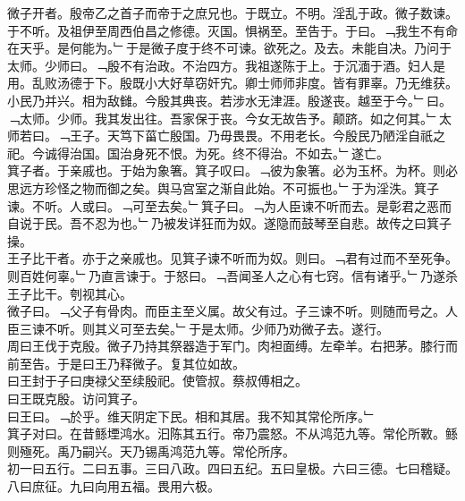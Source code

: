 \documentclass{zhvt-classic}
\begin{document}

\hspace*{2em}微子开者。殷帝乙之首子而帝于之庶兄也。于既立。不明。淫乱于政。微子数谏。于不听。及祖伊至周西伯昌之修德。灭国。惧祸至。至告于。于曰。﹁我生不有命在天乎。是何能为。﹂于是微子度于终不可谏。欲死之。及去。未能自决。乃问于太师。少师曰。﹁殷不有治政。不治四方。我祖遂陈于上。于沉湎于酒。妇人是用。乱败汤德于下。殷既小大好草窃奸宄。卿士师师非度。皆有罪辜。乃无维获。小民乃并兴。相为敌雠。今殷其典丧。若涉水无津涯。殷遂丧。越至于今。﹂曰。﹁太师。少师。我其发出往。吾家保于丧。今女无故告予。颠跻。如之何其。﹂太师若曰。﹁王子。天笃下菑亡殷国。乃毋畏畏。不用老长。今殷民乃陋淫自祇之祀。今诚得治国。国治身死不恨。为死。终不得治。不如去。﹂遂亡。\\
\hspace*{2em}箕子者。于亲戚也。于始为象箸。箕子叹曰。﹁彼为象箸。必为玉杯。为杯。则必思远方珍怪之物而御之矣。舆马宫室之渐自此始。不可振也。﹂于为淫泆。箕子谏。不听。人或曰。﹁可至去矣。﹂箕子曰。﹁为人臣谏不听而去。是彰君之恶而自说于民。吾不忍为也。﹂乃被发详狂而为奴。遂隐而鼓琴至自悲。故传之曰箕子操。\\
\hspace*{2em}王子比干者。亦于之亲戚也。见箕子谏不听而为奴。则曰。﹁君有过而不至死争。则百姓何辜。﹂乃直言谏于。于怒曰。﹁吾闻圣人之心有七窍。信有诸乎。﹂乃遂杀王子比干。刳视其心。\\
\hspace*{2em}微子曰。﹁父子有骨肉。而臣主至义属。故父有过。子三谏不听。则随而号之。人臣三谏不听。则其义可至去矣。﹂于是太师。少师乃劝微子去。遂行。\\
\hspace*{2em}周曰王伐于克殷。微子乃持其祭器造于军门。肉袒面缚。左牵羊。右把茅。膝行而前至告。于是曰王乃释微子。复其位如故。\\
\hspace*{2em}曰王封于子曰庚禄父至续殷祀。使管叔。蔡叔傅相之。\\
\hspace*{2em}曰王既克殷。访问箕子。\\
\hspace*{2em}曰王曰。﹁於乎。维天阴定下民。相和其居。我不知其常伦所序。﹂\\
\hspace*{2em}箕子对曰。在昔鲧堙鸿水。汩陈其五行。帝乃震怒。不从鸿范九等。常伦所斁。鲧则殛死。禹乃嗣兴。天乃锡禹鸿范九等。常伦所序。\\
\hspace*{2em}初一曰五行。二曰五事。三曰八政。四曰五纪。五曰皇极。六曰三德。七曰稽疑。八曰庶征。九曰向用五福。畏用六极。\\
\end{document}
